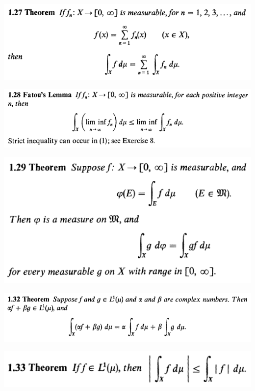 \documentclass[12pt]{article}
\begin{document}
		\begin{center}
		\includegraphics{1ponto27}
		\end{center}

		\begin{center}
		\includegraphics{1ponto28}
		\end{center}

		\begin{center}
		\includegraphics{1ponto29}
		\end{center}

		\begin{center}
		\includegraphics{1ponto32}
		\end{center}

		\begin{center}
		\includegraphics{1ponto33}
		\end{center}
\end{document}
